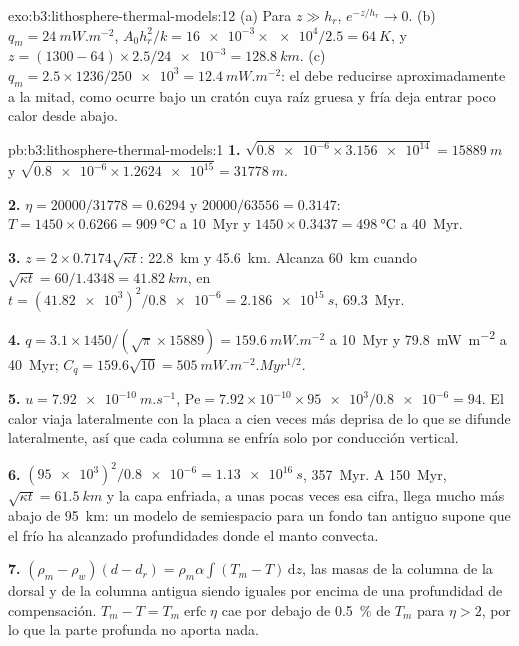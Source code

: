 \begin{solution}{exo:b3:lithosphere-thermal-models:12}
(a) Para $z \gg h_r$, $e^{-z/h_r} \to 0$. (b) $q_m = \qty{24}{mW.m^{-2}}$,
$A_0h_r^2/k = \num{16e-3}\times\num{e4}/2.5 = \qty{64}{K}$, y $z = (1300 -
64)\times2.5/\num{24e-3} = \qty{128.8}{km}$. (c) $q_m = 2.5\times1236/\num{250e3}
= \qty{12.4}{mW.m^{-2}}$: el  debe reducirse aproximadamente a la mitad, como ocurre bajo un
cratón cuya raíz gruesa y fría deja entrar poco calor desde abajo.
\end{solution}

\begin{solution}{pb:b3:lithosphere-thermal-models:1}
\textbf{1.} $\sqrt{\num{0.8e-6}\times\num{3.156e14}} = \qty{15889}{m}$ y
$\sqrt{\num{0.8e-6}\times\num{1.2624e15}} = \qty{31778}{m}$.

\textbf{2.} $\eta = 20000/31778 = 0.6294$ y $20000/63556 = 0.3147$:
$T = 1450\times0.6266 = \qty{909}{\celsius}$ a \qty{10}{Myr} y
$1450\times0.3437 = \qty{498}{\celsius}$ a \qty{40}{Myr}.

\textbf{3.} $z = 2\times0.7174\sqrt{\kappa t}$: \qty{22.8}{km} y
\qty{45.6}{km}. Alcanza \qty{60}{km} cuando $\sqrt{\kappa t} = 60/1.4348 =
\qty{41.82}{km}$, en $t = (\num{41.82e3})^2/\num{0.8e-6} = \qty{2.186e15}{s}$,
\qty{69.3}{Myr}.

\textbf{4.} $q = 3.1\times1450/(\sqrt\pi\times15889) = \qty{159.6}{mW.m^{-2}}$ a
\qty{10}{Myr} y \qty{79.8}{mW.m^{-2}} a \qty{40}{Myr}; $C_q = 159.6\sqrt{10}
= \qty{505}{mW.m^{-2}.Myr^{1/2}}$.

\textbf{5.} $u = \qty{7.92e-10}{m.s^{-1}}$, $\mathrm{Pe} = 7.92\times10^{-10}
\times\num{95e3}/\num{0.8e-6} = 94$. El calor viaja lateralmente con la placa a
cien veces más deprisa de lo que se difunde lateralmente, así que cada columna se enfría
solo por conducción vertical.

\textbf{6.} $(\num{95e3})^2/\num{0.8e-6} = \qty{1.13e16}{s}$, \qty{357}{Myr}.
A \qty{150}{Myr}, $\sqrt{\kappa t} = \qty{61.5}{km}$ y la capa enfriada, a
unas pocas veces esa cifra, llega mucho más abajo de \qty{95}{km}: un modelo de semiespacio para un fondo tan antiguo
supone que el frío ha alcanzado profundidades donde el manto convecta.

\textbf{7.} $(\rho_m - \rho_w)(d - d_r) = \rho_m\alpha\int(T_m - T)\,\mathrm dz$,
las masas de la columna de la dorsal y de la columna antigua siendo iguales por encima de una
profundidad de compensación. $T_m - T = T_m\operatorname{erfc}\eta$ cae por debajo de
\qty{0.5}{\percent} de $T_m$ para $\eta > 2$, por lo que la parte profunda no aporta nada.


\end{solution}
